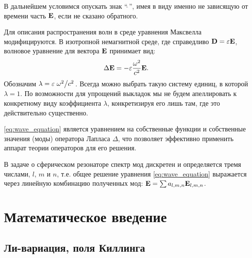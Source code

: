 \documentclass[12pt,a4paper]{article}
\begin{document}
        В дальнейшем условимся опускать знак \enquote{$\hat{\ }$}, имея в виду именно не зависящую от времени часть $\mathbf{E}$, если не сказано обратного.

        Для описания распространения волн в среде уравнения Максвелла модифицируются. В изотропной немагнитной среде, где справедливо $\mathbf{D} = \varepsilon \mathbf{E}$, волновое уравнение для вектора $\mathbf{E}$ принимает вид:
        \begin{equation}\label{eq:wave_equation}
            \Delta \mathbf{E} = - \varepsilon \frac{\omega^2}{c^2} \mathbf{E} .
        \end{equation}
        Обозначим $\lambda = \varepsilon \flatfrac{\omega^2}{c^2}$. Всегда можно выбрать такую систему единиц, в которой $\lambda = 1$. По возможности для упрощений выкладок мы не будем апеллировать к конкретному виду коэффициента $\lambda$, конкретизируя его лишь там, где это действительно существенно.

        \autoref{eq:wave_equation} является уравнением на собственные функции и собственные значения (моды) оператора Лапласа $\Delta$, что позволяет эффективно применить аппарат теории операторов для его решения.

        В задаче о сферическом резонаторе спектр мод дискретен и определяется тремя числами, $l$, $m$ и $n$, т.е. общее решение уравнения \autoref{eq:wave_equation} выражается через линейную комбинацию полученных мод: $\mathbf{E} = \sum a_{l,m,n} \mathbf{E}_{l,m,n}$.


    \section{Математическое введение}


        \subsection{Ли-вариация, поля Киллинга}
\end{document}
